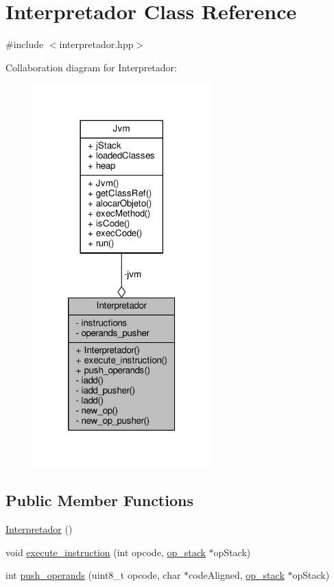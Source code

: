 \hypertarget{classInterpretador}{\section{Interpretador Class Reference}
\label{classInterpretador}
}


{\ttfamily \#include $<$interpretador.\+hpp$>$}



Collaboration diagram for Interpretador\+:\nopagebreak
\begin{figure}[H]
\begin{center}
\leavevmode
\includegraphics[width=194pt]{classInterpretador__coll__graph}
\end{center}
\end{figure}
\subsection*{Public Member Functions}
\begin{DoxyCompactItemize}
\item 
\hyperlink{classInterpretador_a12d844a7ab8d634e96b57971c9aedd9e}{Interpretador} ()
\item 
void \hyperlink{classInterpretador_a2a8c4a95bc1fa1e6a689059f6f7ecb8c}{execute\+\_\+instruction} (int opcode, \hyperlink{frame_8hpp_a27f9a444058fa5dfb484ef1347edd937}{op\+\_\+stack} $\ast$op\+Stack)
\item 
int \hyperlink{classInterpretador_a0a8a79662aafc9cd4a7a194350c7165c}{push\+\_\+operands} (uint8\+\_\+t opcode, char $\ast$code\+Aligned, \hyperlink{frame_8hpp_a27f9a444058fa5dfb484ef1347edd937}{op\+\_\+stack} $\ast$op\+Stack)
\end{DoxyCompactItemize}
